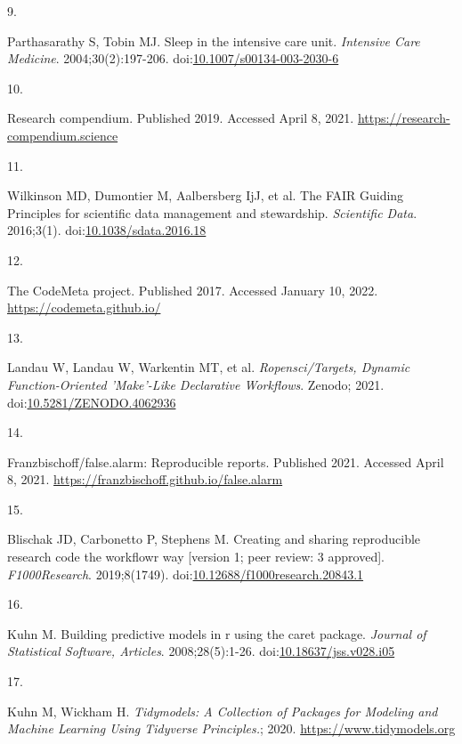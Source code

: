 \documentclass[12pt,twoside]{fmupthesis}
\newlength{\csllabelwidth}
\newlength{\cslhangindent}
\newenvironment{CSLReferences}[2] %
 {%
  \setlength{\parindent}{0pt}
  \ifodd #1 \everypar{\setlength{\hangindent}{\cslhangindent}}\ignorespaces\fi
  \ifnum #2 > 0
  \setlength{\parskip}{#2\baselineskip}
  \fi
 }%
 {}
\newcommand{\CSLLeftMargin}[1]{\parbox[t]{\csllabelwidth}{#1}}
\newcommand{\CSLRightInline}[1]{\parbox[t]{\linewidth - \csllabelwidth}{#1}}
\begin{document}
\begin{CSLReferences}{0}{0}
\leavevmode{}%
\CSLLeftMargin{9. }
\CSLRightInline{Parthasarathy S, Tobin MJ. Sleep in the intensive care unit. \emph{Intensive Care Medicine}. 2004;30(2):197-206. doi:\href{https://doi.org/10.1007/s00134-003-2030-6}{10.1007/s00134-003-2030-6}}

\leavevmode{}%
\CSLLeftMargin{10. }
\CSLRightInline{Research compendium. Published 2019. Accessed April 8, 2021. \url{https://research-compendium.science}}

\leavevmode{}%
\CSLLeftMargin{11. }
\CSLRightInline{Wilkinson MD, Dumontier M, Aalbersberg IjJ, et al. The FAIR Guiding Principles for scientific data management and stewardship. \emph{Scientific Data}. 2016;3(1). doi:\href{https://doi.org/10.1038/sdata.2016.18}{10.1038/sdata.2016.18}}

\leavevmode{}%
\CSLLeftMargin{12. }
\CSLRightInline{The CodeMeta project. Published 2017. Accessed January 10, 2022. \url{https://codemeta.github.io/}}

\leavevmode{}%
\CSLLeftMargin{13. }
\CSLRightInline{Landau W, Landau W, Warkentin MT, et al. \emph{Ropensci/Targets, Dynamic Function-Oriented 'Make'-Like Declarative Workflows}. Zenodo; 2021. doi:\href{https://doi.org/10.5281/ZENODO.4062936}{10.5281/ZENODO.4062936}}

\leavevmode{}%
\CSLLeftMargin{14. }
\CSLRightInline{Franzbischoff/false.alarm: Reproducible reports. Published 2021. Accessed April 8, 2021. \url{https://franzbischoff.github.io/false.alarm}}

\leavevmode{}%
\CSLLeftMargin{15. }
\CSLRightInline{Blischak JD, Carbonetto P, Stephens M. Creating and sharing reproducible research code the workflowr way {[}version 1; peer review: 3 approved{]}. \emph{F1000Research}. 2019;8(1749). doi:\href{https://doi.org/10.12688/f1000research.20843.1}{10.12688/f1000research.20843.1}}

\leavevmode{}%
\CSLLeftMargin{16. }
\CSLRightInline{Kuhn M. Building predictive models in r using the caret package. \emph{Journal of Statistical Software, Articles}. 2008;28(5):1-26. doi:\href{https://doi.org/10.18637/jss.v028.i05}{10.18637/jss.v028.i05}}

\leavevmode{}%
\CSLLeftMargin{17. }
\CSLRightInline{Kuhn M, Wickham H. \emph{Tidymodels: A Collection of Packages for Modeling and Machine Learning Using Tidyverse Principles.}; 2020. \url{https://www.tidymodels.org}}


\end{CSLReferences}
\end{document}
